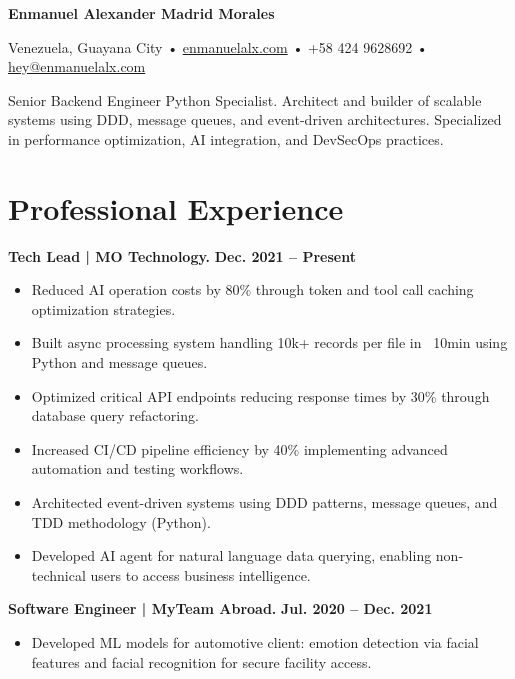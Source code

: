 \documentclass[11pt,a4paper]{article}
\begin{document}
\begin{center}
    {\Huge \textbf{\color{black} Enmanuel Alexander Madrid Morales}}

    \vspace{0.2cm}

    Venezuela, Guayana City • \href{https://enmanuelalx.com}{enmanuelalx.com} • +58 424 9628692 • \href{mailto:hey@enmanuelalx.com}{hey@enmanuelalx.com}
\end{center}

\vspace{0.4cm}

Senior Backend Engineer Python Specialist. Architect and builder of scalable systems using DDD, message queues, and event-driven architectures. Specialized in performance optimization, AI integration, and DevSecOps practices.

\vspace{0.3cm}

\section*{Professional Experience}

\noindent
\textbf{\color{black} Tech Lead | MO Technology.} \hfill \textbf{\color{black} Dec. 2021 -- Present}
\begin{itemize}[leftmargin=*, itemsep=0pt, parsep=4pt]
    \item Reduced AI operation costs by 80\% through token and tool call caching optimization strategies.
    \item Built async processing system handling 10k+ records per file in ~10min using Python and message queues.
    \item Optimized critical API endpoints reducing response times by 30\% through database query refactoring.
    \item Increased CI/CD pipeline efficiency by 40\% implementing advanced automation and testing workflows.
    \item Architected event-driven systems using DDD patterns, message queues, and TDD methodology (Python).
    \item Developed AI agent for natural language data querying, enabling non-technical users to access business intelligence.
\end{itemize}

\vspace{0.3cm}

\noindent
\textbf{\color{black} Software Engineer | MyTeam Abroad.} \hfill \textbf{\color{black} Jul. 2020 -- Dec. 2021}
\begin{itemize}[leftmargin=*, itemsep=0pt, parsep=4pt]
    \item Developed ML models for automotive client: emotion detection via facial features and facial recognition for secure facility access.
\end{itemize}
\end{document}
